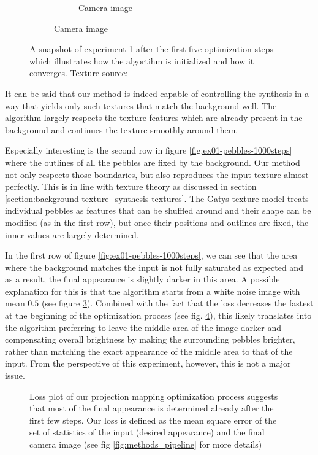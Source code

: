 \begin{figure}[]
\begin{subfigure}{\textwidth}
\begin{subfigure}{0.24\textwidth}
            \caption{Camera image}
            \label{fig:ex01-pebbles-5steps-threshold_proj}
        \end{subfigure}
    \end{subfigure}
    \caption{A snapshot of experiment 1 after the first five optimization steps which illustrates how the algortihm is initialized and how it converges. Texture source: \citet{Gatys2015}}
    \label{fig:ex01-pebbles-5steps}
\end{figure}

It can be said that our method is indeed capable of controlling the synthesis in a way that yields only such textures that match the background well. The algorithm largely respects the texture features which are already present in the background and continues the texture smoothly around them. 

Especially interesting is the second row in figure \ref{fig:ex01-pebbles-1000steps} where the outlines of all the pebbles are fixed by the background. Our method not only respects those boundaries, but also reproduces the input texture almost perfectly. This is in line with texture theory as discussed in section \ref{section:background-texture_synthesis-textures}. The Gatys texture model treats individual pebbles as features that can be shuffled around and their shape can be modified (as in the first row), but once their positions and outlines are fixed, the inner values are largely determined.

In the first row of figure \ref{fig:ex01-pebbles-1000steps}, we can see that the area where the background matches the input is not fully saturated as expected and as a result, the final appearance is slightly darker in this area. A possible explanation for this is that the algorithm starts from a white noise image with mean \(0.5\) (see figure \ref{fig:ex01-pebbles-5steps}). Combined with the fact that the loss decreases the fastest at the beginning of the optimization process (see fig. \ref{fig:ex01-loss_plot}), this likely translates into the algorithm preferring to leave the middle area of the image darker and compensating overall brightness by making the surrounding pebbles brighter, rather than matching the exact appearance of the middle area to that of the input. From the perspective of this experiment, however, this is not a major issue.

\begin{figure}[ht]
    \centering
    \def\svgwidth{0.8\textwidth}
    
    \caption{Loss plot of our projection mapping optimization process suggests that most of the final appearance is determined already after the first few steps. Our loss is defined as the mean square error of the set of statistics of the input (desired appearance) and the final camera image (see fig \ref{fig:methods_pipeline} for more details)}
    \label{fig:ex01-loss_plot}
\end{figure}

